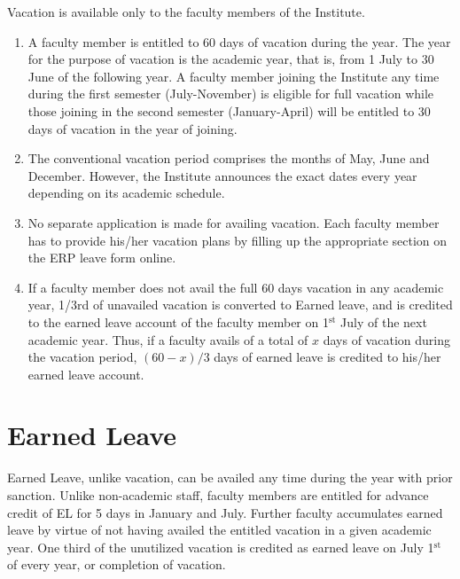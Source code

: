 \documentclass[
  10pt,
  a5paper,
  10pt,
  openany]{amsbook}
\providecommand{\tightlist}{%
  \setlength{\itemsep}{0pt}\setlength{\parskip}{0pt}}
\begin{document}
Vacation is available only to the faculty members of the Institute.

\begin{enumerate}
\def\labelenumi{\arabic{enumi}.}
\tightlist
\item
  A faculty member is entitled to 60 days of vacation during the year.
  The year for the purpose of vacation is the academic year, that is,
  from 1 July to 30 June of the following year. A faculty member joining
  the Institute any time during the first semester (July-November) is
  eligible for full vacation while those joining in the second semester
  (January-April) will be entitled to 30 days of vacation in the year of
  joining.
\item
  The conventional vacation period comprises the months of May, June and
  December. However, the Institute announces the exact dates every year
  depending on its academic schedule.
\item
  No separate application is made for availing vacation. Each faculty
  member has to provide his/her vacation plans by filling up the
  appropriate section on the ERP leave form online.
\item
  If a faculty member does not avail the full 60 days vacation in any
  academic year, 1/3rd of unavailed vacation is converted to Earned
  leave, and is credited to the earned leave account of the faculty
  member on 1\(^{\text{st}}\) July of the next academic year. Thus, if a
  faculty avails of a total of \(x\) days of vacation during the
  vacation period, \((60-x)/3\) days of earned leave is credited to
  his/her earned leave account.
\end{enumerate}

\section{Earned Leave}\label{earned-leave}

Earned Leave, unlike vacation, can be availed any time during the year
with prior sanction. Unlike non-academic staff, faculty members are
entitled for advance credit of EL for 5 days in January and July.
Further faculty accumulates earned leave by virtue of not having availed
the entitled vacation in a given academic year. One third of the
unutilized vacation is credited as earned leave on July
1\(^{\text{st}}\) of every year, or completion of vacation.
\end{document}
